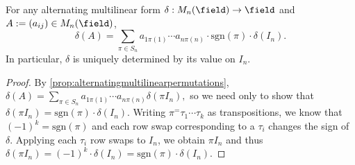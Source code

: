 \begin{corollary}\label{cor:detuniqueness}
    For any alternating multilinear form $\delta : M_n(\field) \to \field$ and $A := (a_{ij}) \in M_{n}(\field)$, \[
    \delta(A)= \sum_{\pi \in S_n} a_{1 \pi(1)} \cdots a_{n \pi(n)} \cdot \text{sgn}(\pi) \cdot \delta(I_n).
    \]
    In particular, $\delta$ is uniquely determined by its value on $I_n$.
\end{corollary}
\begin{proof}
    By \cref{prop:alternatingmultilinearpermutations}, $\delta(A) = \sum_{\pi \in S_n} a_{1 \pi(1)} \cdots a_{n \pi(n)}  \delta(\pi I_n),$ so we need only to show that $\delta(\pi I_n) = \text{sgn}(\pi) \cdot \delta(I_n)$. Writing $\pi^ = \tau_1 \cdots \tau_k$ as transpositions, we know that $(-1)^k = \text{sgn}(\pi)$ and each row swap corresponding to a $\tau_i$ changes the sign of $\delta$. Applying each $\tau_i$ row swaps to $I_n$, we obtain $\pi I_n$ and thus $\delta(\pi I_n) = (-1)^k \cdot \delta(I_n) = \text{sgn}(\pi) \cdot \delta(I_n)$.
\end{proof}


